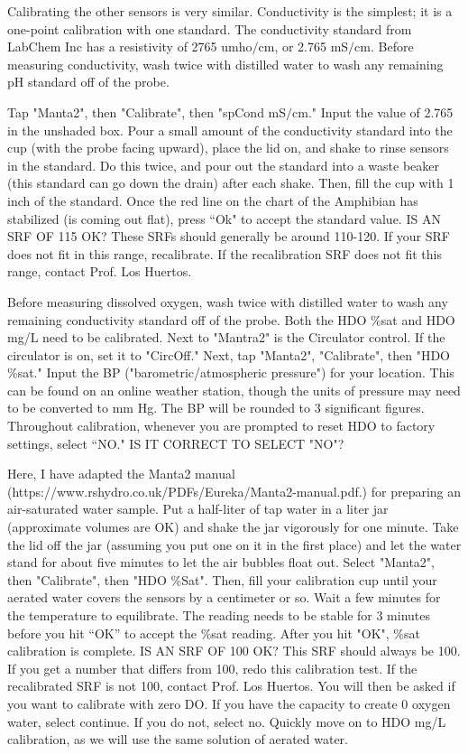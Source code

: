 \documentclass[12pt]{../SOP3}\usepackage[]{graphicx}\usepackage[]{color}
\begin{document}
\NP Calibrating the other sensors is very similar. Conductivity is the simplest; it is a one-point calibration with one standard. The conductivity standard from LabChem Inc has a resistivity of 2765 umho$/$cm, or 2.765 mS$/$cm.  Before measuring conductivity, wash twice with distilled water to wash any remaining pH standard off of the probe. 

\NP Tap "Manta2", then "Calibrate", then "spCond mS$/$cm." Input the value of 2.765 in the unshaded box. Pour a small amount of the conductivity standard into the cup (with the probe facing upward), place the lid on, and shake to rinse sensors in the standard. Do this twice, and pour out the standard into a waste beaker (this standard can go down the drain) after each shake. Then, fill the cup with 1 inch of the standard. Once the red line on the chart of the Amphibian has stabilized (is coming out flat), press ``Ok" to accept the standard value. IS AN SRF OF 115 OK? These SRFs should generally be around 110-120. If your SRF does not fit in this range, recalibrate. If the recalibration SRF does not fit this range, contact Prof. Los Huertos.  

\NP Before measuring dissolved oxygen, wash twice with distilled water to wash any remaining conductivity standard off of the probe. Both the HDO \%sat and HDO mg/L need to be calibrated. Next to "Mantra2" is the Circulator control. If the circulator is on, set it to "CircOff." Next, tap "Manta2", "Calibrate", then "HDO \%sat." Input the BP ("barometric/atmospheric pressure") for your location. This can be found on an online weather station, though the units of pressure may need to be converted to mm Hg. The BP will be rounded to 3 significant figures. Throughout calibration, whenever you are prompted to reset HDO to factory settings, select “NO." IS IT CORRECT TO SELECT "NO"? 

\NP Here, I have adapted the Manta2 manual (https://www.rshydro.co.uk/PDFs/Eureka/Manta2-manual.pdf.) for preparing an air-saturated water sample. Put a half-liter of tap water in a liter jar (approximate volumes are OK) and shake the jar vigorously for one minute. Take the lid off the jar (assuming you put one on it in the first place) and let the water stand for about five minutes to let the air bubbles float out. Select "Manta2", then "Calibrate", then "HDO \%Sat". Then, fill your calibration cup until your aerated water covers the sensors by a centimeter or so. Wait a few minutes for the temperature to equilibrate. The reading needs to be stable for 3 minutes before you hit “OK” to accept the \%sat reading. After you hit "OK", \%sat calibration is complete. IS AN SRF OF 100 OK? This SRF should always be 100. If you get a number that differs from 100, redo this calibration test. If the recalibrated SRF is not 100, contact Prof. Los Huertos.  You will then be asked if you want to calibrate with zero DO. If you have the capacity to create 0 oxygen water, select continue. If you do not, select no. Quickly move on to HDO mg/L calibration, as we will use the same solution of aerated water. 
\end{document}
